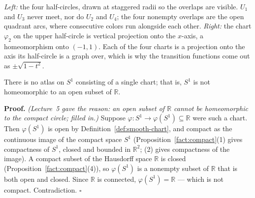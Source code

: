 \documentclass[11pt]{report}
\makeatletter
\newcounter{thmcounter}[section]
\renewenvironment{proof}[1][Proof]{\noindent\textbf{#1.} }{\hfill$\square$\par\vspace{5pt}}
\newcommand{\thmlabel}[1]{\edef\@currentlabel{\arabic{section}.\arabic{thmcounter}}\label{#1}}
\makeatother
\begin{document}
\begin{center}
\end{center}

\emph{Left:} the four half-circles, drawn at staggered radii so the overlaps are visible. $U_1$ and $U_3$ never meet, nor do $U_2$ and $U_4$; the four nonempty overlaps are the open quadrant arcs, where consecutive colors run alongside each other. \emph{Right:} the chart $\varphi_2$ on the upper half-circle is vertical projection onto the $x$-axis, a homeomorphism onto $(-1,1)$. Each of the four charts is a projection onto the axis its half-circle is a graph over, which is why the transition functions come out as $\pm\sqrt{1-t^2}$.

\begin{propbox}\thmlabel{prop:circle-no-global-chart}
There is no atlas on $S^1$ consisting of a single chart; that is, $S^1$ is not homeomorphic to an open subset of $\mathbb{R}$.
\end{propbox}

\begin{proof}
\textit{(Lecture~5 gave the reason: an open subset of $\mathbb{R}$ cannot be homeomorphic to the compact circle; filled in.)} Suppose $\varphi : S^1 \to \varphi(S^1) \subseteq \mathbb{R}$ were such a chart. Then $\varphi(S^1)$ is open by Definition~\ref{def:smooth-chart}, and compact as the continuous image of the compact space $S^1$ (Proposition~\ref{fact:compact}(1) gives compactness of $S^1$, closed and bounded in $\mathbb{R}^2$; (2) gives compactness of the image). A compact subset of the Hausdorff space $\mathbb{R}$ is closed (Proposition~\ref{fact:compact}(4)), so $\varphi(S^1)$ is a nonempty subset of $\mathbb{R}$ that is both open and closed. Since $\mathbb{R}$ is connected, $\varphi(S^1) = \mathbb{R}$ --- which is not compact. Contradiction.
\end{proof}
\end{document}
